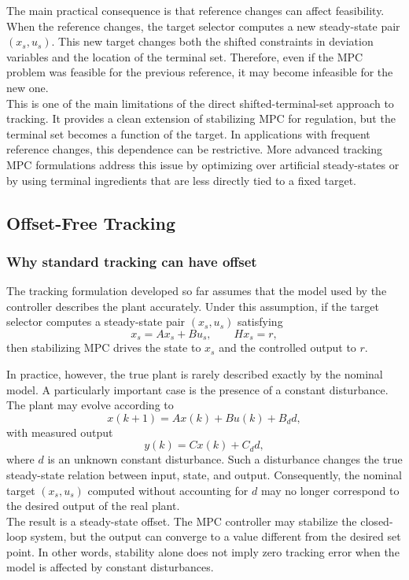 The main practical consequence is that reference changes can affect feasibility. When the
reference changes, the target selector computes a new steady-state pair \((x_s,u_s)\). This new
target changes both the shifted constraints in deviation variables and the location of the
terminal set. Therefore, even if the MPC problem was feasible for the previous reference, it may
become infeasible for the new one.\\
This is one of the main limitations of the direct shifted-terminal-set approach to tracking.
It provides a clean extension of stabilizing MPC for regulation, but the terminal set becomes a
function of the target. In applications with frequent reference changes, this dependence can be
restrictive. More advanced tracking MPC formulations address this issue by optimizing over
artificial steady-states or by using terminal ingredients that are less directly tied to a fixed target.
\subsection{Offset-Free Tracking}

\subsubsection{Why standard tracking can have offset}

The tracking formulation developed so far assumes that the model used by the controller
describes the plant accurately. Under this assumption, if the target selector computes a
steady-state pair \((x_s,u_s)\) satisfying
\[
    x_s = Ax_s + Bu_s,
    \qquad
    Hx_s = r,
\]
then stabilizing MPC drives the state to \(x_s\) and the controlled output to \(r\).

In practice, however, the true plant is rarely described exactly by the nominal model. A
particularly important case is the presence of a constant disturbance. The plant may evolve
according to
\[
    x(k+1)=Ax(k)+Bu(k)+B_d d,
\]
with measured output
\[
    y(k)=Cx(k)+C_d d,
\]
where \(d\) is an unknown constant disturbance. Such a disturbance changes the true
steady-state relation between input, state, and output. Consequently, the nominal target
\((x_s,u_s)\) computed without accounting for \(d\) may no longer correspond to the desired
output of the real plant.\\
The result is a steady-state offset. The MPC controller may stabilize the closed-loop system, but
the output can converge to a value different from the desired set point. In other words, stability
alone does not imply zero tracking error when the model is affected by constant disturbances.

